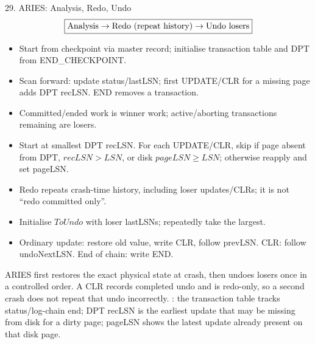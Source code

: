 \begin{warningbox}{29. ARIES: Analysis, Redo, Undo}
\[
\boxed{\text{Analysis}\rightarrow\text{Redo (repeat history)}\rightarrow\text{Undo losers}}
\]
\begin{itemize}
  \item Start from checkpoint via master record; initialise transaction table and DPT from END\_CHECKPOINT.
  \item Scan forward: update status/lastLSN; first UPDATE/CLR for a missing page adds DPT recLSN. END removes a transaction.
  \item Committed/ended work is winner work; active/aborting transactions remaining are losers.
\end{itemize}
\begin{itemize}
  \item Start at smallest DPT recLSN. For each UPDATE/CLR, skip if page absent from DPT, \(recLSN>LSN\), or disk \(pageLSN\ge LSN\); otherwise reapply and set pageLSN.
  \item Redo repeats crash-time history, including loser updates/CLRs; it is not ``redo committed only''.
\end{itemize}
\smallskip
{}
\begin{itemize}
  \item Initialise \(ToUndo\) with loser lastLSNs; repeatedly take the largest.
  \item Ordinary update: restore old value, write CLR, follow prevLSN. CLR: follow undoNextLSN. End of chain: write END.
\end{itemize}
\why ARIES first restores the exact physical state at crash, then undoes losers once in a controlled order. A CLR records completed undo and is redo-only, so a second crash does not repeat that undo incorrectly.
: the transaction table tracks status/log-chain end; DPT recLSN is the earliest update that may be missing from disk for a dirty page; pageLSN shows the latest update already present on that disk page.
\end{warningbox}

